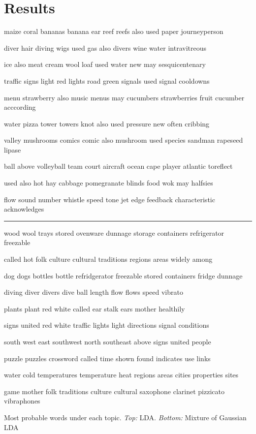 \documentclass[11pt]{article}
\begin{document}
\section{Results}
\begin{table}
{\tiny
\par maize coral bananas banana ear reef reefs also used paper journeyperson
\par diver hair diving wigs used gas also divers wine water intravitreous
\par ice also meat cream wool loaf used water new may sesquicentenary
\par traffic signs light red lights road green signals used signal cooldowns
\par menu strawberry also music menus may cucumbers strawberries fruit cucumber acccording
\par water pizza tower towers knot also used pressure new often cribbing
\par valley mushrooms comics comic also mushroom used species sandman rapeseed lipase
\par ball above volleyball team court aircraft ocean cape player atlantic toreflect
\par used also hot hay cabbage pomegranate blinds food wok may halfsies
\par flow sound number whistle speed tone jet edge feedback characteristic acknowledges
\par
}

\rule{\columnwidth}{1pt}

{\tiny 
\par wood wool trays stored ovenware dunnage storage containers refrigerator freezable 
\par called hot folk culture cultural traditions regions areas widely among 
\par dog dogs bottles bottle refridgerator freezable stored containers fridge dunnage 
\par diving diver divers dive ball length flow flows speed vibrato 
\par plants plant red white called ear stalk ears mother healthily 
\par signs united red white traffic lights light directions signal conditions 
\par south west east southwest north southeast above signs united people 
\par puzzle puzzles crossword called time shown found indicates use links 
\par water cold temperatures temperature heat regions areas cities properties sites 
\par game mother folk traditions culture cultural saxophone clarinet pizzicato vibraphones 
\par
}

\caption{\label{tbl:topics} Most probable words under each topic. \emph{Top:} LDA. \emph{Bottom:} Mixture of Gaussian LDA}
\end{table}
\end{document}
